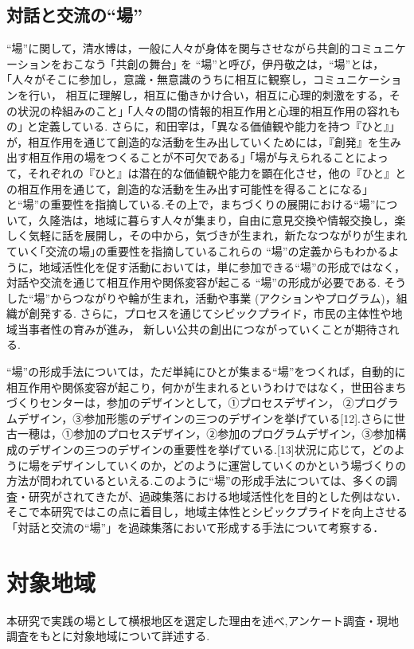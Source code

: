 \documentclass[a4paper]{jsarticle}
\begin{document}
\subsection{対話と交流の“場”}
“場”に関して，清水博は，一般に人々が身体を関与させながら共創的コミュニケーションをおこなう ｢共創の舞台｣ を “場”と呼び\cite{9}，伊丹敬之は，“場”とは，｢人々がそこに参加し，意識・無意識のうちに相互に観察し，コミュニケーションを行い， 相互に理解し，相互に働きかけ合い，相互に心理的刺激をする，その状況の枠組みのこと｣ ｢人々の間の情報的相互作用と心理的相互作用の容れもの｣ と定義している\cite{10}. さらに，和田宰は，｢異なる価値観や能力を持つ『ひと』｣ が，相互作用を通じて創造的な活動を生み出していくためには，『創発』を生み出す相互作用の場をつくることが不可欠である｣ ｢場が与えられることによって，それぞれの『ひと』は潜在的な価値観や能力を顕在化させ，他の『ひと』との相互作用を通じて，創造的な活動を生み出す可能性を得ることになる｣ と“場”の重要性を指摘している\cite{11}.その上で，まちづくりの展開における“場”について，久隆浩は，地域に暮らす人々が集まり，自由に意見交換や情報交換し，楽しく気軽に話を展開し，その中から，気づきが生まれ，新たなつながりが生まれていく｢交流の場｣の重要性を指摘している\cite{12}これらの “場”の定義からもわかるように，地域活性化を促す活動においては，単に参加できる“場”の形成ではなく，対話や交流を通じて相互作用や関係変容が起こる “場”の形成が必要である. そうした“場”からつながりや輪が生まれ，活動や事業 (アクションやプログラム)，組織が創発する. さらに，プロセスを通じてシビックプライド，市民の主体性や地域当事者性の育みが進み， 新しい公共の創出につながっていくことが期待される.\par“場”の形成手法については，ただ単純にひとが集まる“場”をつくれば，自動的に相互作用や関係変容が起こり，何かが生まれるというわけではなく，世田谷まちづくりセンターは，参加のデザインとして，①プロセスデザイン， ②プログラムデザイン，③参加形態のデザインの三つのデザインを挙げている[12].さらに世古一穂は，①参加のプロセスデザイン，②参加のプログラムデザイン，③参加構成のデザインの三つのデザインの重要性を挙げている.[13]状況に応じて，どのように場をデザインしていくのか，どのように運営していくのかという場づくりの方法が問われているといえる.このように“場”の形成手法については、多くの調査・研究がされてきたが、過疎集落における地域活性化を目的とした例はない．そこで本研究ではこの点に着目し，地域主体性とシビックプライドを向上させる「対話と交流の“場”」を過疎集落において形成する手法について考察する．






\section{対象地域}
本研究で実践の場として横根地区を選定した理由を述べ,アンケート調査・現地調査をもとに対象地域について詳述する.
\end{document}
